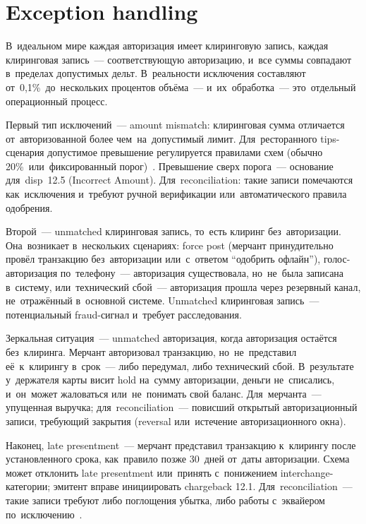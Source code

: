 \section{Exception handling}
\label{sec:recon-exceptions}

В~идеальном мире каждая авторизация имеет клиринговую запись, каждая
клиринговая запись~--- соответствующую авторизацию, и~все суммы
совпадают в~пределах допустимых дельт. В~реальности исключения составляют
от~0,1\%~до~нескольких процентов объёма~--- и~их~обработка~--- это~отдельный
операционный процесс.

Первый тип исключений~--- amount mismatch: клиринговая сумма отличается
от~авторизованной более чем~на~допустимый лимит. Для~ресторанного tips-сценария допустимое
превышение регулируется правилами схем (обычно 20\%~или~фиксированный
порог)~. Превышение сверх порога~--- основание
для~disp~12.5 (Incorrect Amount). Для~reconciliation: такие записи
помечаются как~исключения и~требуют ручной верификации или~автоматического
правила одобрения.

Второй~--- unmatched клиринговая запись, то~есть клиринг без~авторизации.
Она~возникает в~нескольких сценариях: force post (мерчант принудительно
провёл транзакцию без~авторизации или~с~ответом \enquote{одобрить
  офлайн}), голос-авторизация по~телефону~--- авторизация существовала,
но~не~была записана в~систему, или~технический сбой~--- авторизация
прошла через резервный канал, не~отражённый в~основной системе.
Unmatched клиринговая запись~--- потенциальный fraud-сигнал и~требует
расследования.

Зеркальная ситуация~--- unmatched авторизация, когда авторизация остаётся без~клиринга. Мерчант
авторизовал транзакцию, но~не~представил её~к~клирингу в~срок~--- либо
передумал, либо технический сбой. В~результате у~держателя карты висит
hold на~сумму авторизации, деньги не~списались, и~он~может жаловаться
или~не~понимать свой баланс. Для~мерчанта~--- упущенная выручка; для~reconciliation~---
повисший открытый авторизационный записи, требующий закрытия (reversal
или~истечение авторизационного окна).

Наконец, late presentment~--- мерчант представил транзакцию к~клирингу
после установленного срока, как~правило позже 30~дней от~даты
авторизации. Схема может отклонить late presentment или~принять с~понижением
interchange-категории; эмитент вправе инициировать chargeback 12.1. Для~reconciliation~---
такие записи требуют либо поглощения убытка, либо работы с~эквайером
по~исключению~.

